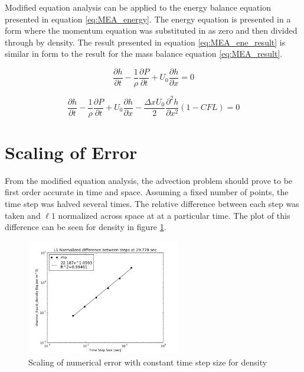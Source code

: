     Modified equation analysis can be applied to the energy balance equation
    presented in equation \ref{eq:MEA_energy}. The energy equation is presented in a form where
    the momentum equation was substituted in as zero and then divided through by
    density. The result presented in equation \ref{eq:MEA_ene_result} is similar in
    form to the result for the mass balance equation \ref{eq:MEA_result}.
    
    \begin{equation}
    	\label{eq:MEA_energy}
    	\frac{\partial h}{\partial t} - \frac{1}{\rho} \frac{\partial P}{\partial t} +
    	U_{0} \frac{\partial h}{\partial x} = 0
    \end{equation}
    
    \begin{equation}
    \label{eq:MEA_ene_result}
    	\frac{\partial h}{\partial t} - \frac{1}{\rho} \frac{\partial P}{\partial t} +
    	U_{0} \frac{\partial h}{\partial x} - 
    	\frac{\Delta x U_{0}}{2} \frac{\partial^2 h}{\partial x^2}
    	\left( 1 - CFL \right)
    	= 0
    \end{equation}
    
    \section{Scaling of Error}

	From the modified equation analysis, the advection problem should prove to
	be first order accurate in time and space. Assuming a fixed number of points,
	the time step was halved several times. The relative difference between each
	step was taken and $\ell 1$ normalized across space at at a particular time.
	The plot of this difference can be seen for density in figure
	\ref{fig:Difference_rho}. 
    
    
    
    \begin{figure}[!h]
    	\centering
    	\includegraphics[width=0.60\textwidth]{images/Isokinetic_Advection/Difference_rho}
    	\caption{Scaling of numerical error with constant time step size for
    	density}
    	\label{fig:Difference_rho}
    \end{figure}
    
